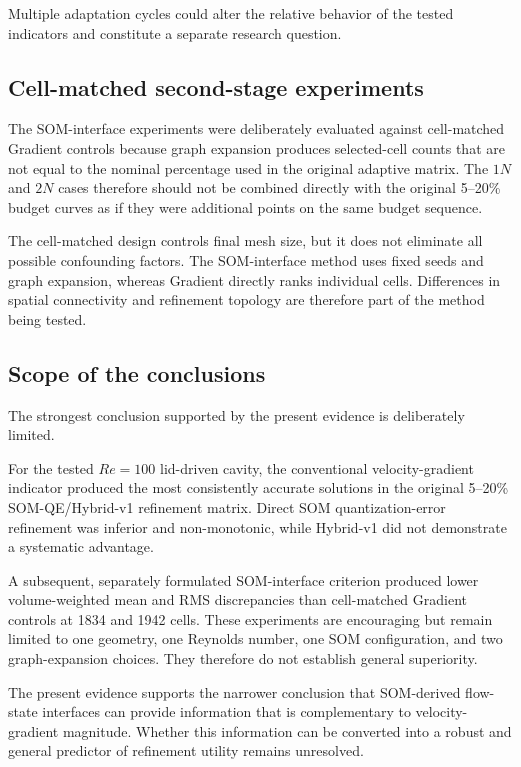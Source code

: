 Multiple adaptation cycles could alter the relative behavior of the tested
indicators and constitute a separate research question.


\subsection{Cell-matched second-stage experiments}

The SOM-interface experiments were deliberately evaluated against
cell-matched Gradient controls because graph expansion produces selected-cell
counts that are not equal to the nominal percentage used in the original
adaptive matrix. The \(1N\) and \(2N\) cases therefore should not be combined
directly with the original 5--20\% budget curves as if they were additional
points on the same budget sequence.

The cell-matched design controls final mesh size, but it does not eliminate
all possible confounding factors. The SOM-interface method uses fixed seeds
and graph expansion, whereas Gradient directly ranks individual cells.
Differences in spatial connectivity and refinement topology are therefore
part of the method being tested.

\subsection{Scope of the conclusions}

The strongest conclusion supported by the present evidence is deliberately
limited.

For the tested \(Re=100\) lid-driven cavity, the conventional
velocity-gradient indicator produced the most consistently accurate
solutions in the original 5--20\% SOM-QE/Hybrid-v1 refinement matrix.
Direct SOM quantization-error refinement was inferior and non-monotonic,
while Hybrid-v1 did not demonstrate a systematic advantage.

A subsequent, separately formulated SOM-interface criterion produced lower
volume-weighted mean and RMS discrepancies than cell-matched Gradient
controls at 1834 and 1942 cells. These experiments are encouraging but
remain limited to one geometry, one Reynolds number, one SOM configuration,
and two graph-expansion choices. They therefore do not establish general
superiority.

The present evidence supports the narrower conclusion that SOM-derived
flow-state interfaces can provide information that is complementary to
velocity-gradient magnitude. Whether this information can be converted into
a robust and general predictor of refinement utility remains unresolved.

